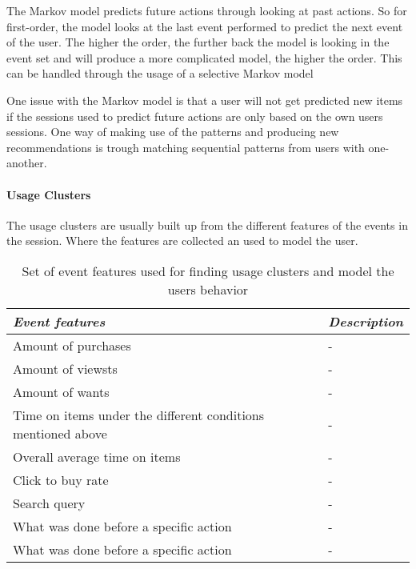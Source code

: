             The Markov model predicts future actions through looking at past actions.
            So for first-order, the model looks at the last event performed to predict the next event of the user.
            The higher the order, the further back the model is looking in the event set and will produce a more complicated model, the higher the order.
            This can be handled through the usage of a selective Markov model~\cite{Deshpande:2004:SMM:990301.990304}

            One issue with the Markov model is that a user will not get predicted new items if the sessions used to predict future actions are only based on the own users sessions.
            One way of making use of the patterns and producing new recommendations is trough matching sequential patterns from users with one-another. 


        \paragraph{Usage Clusters} %
        \label{subp:usage_clusters}
            The usage clusters are usually built up from the different features of the events in the session.
            Where the features are collected an used to model the user.

            \begin{table}[H]
                \centering
                \begin{tabular}{l|l}
                    \emph{Event features} & \emph{Description} \\ \hline
                    Amount of purchases & - \\ \hline
                    Amount of viewsts & - \\ \hline
                    Amount of wants & - \\ \hline
                    Time on items under the different conditions mentioned above & -\\ \hline
                    Overall average time on items & - \\ \hline
                    Click to buy rate & - \\ \hline
                    Search query~\cite{Zhang:2006:MSE:1135777.1136004} & - \\ \hline
                    What was done before a specific action & - \\ \hline
                    What was done before a specific action & - \\
                \end{tabular}
                \caption[Event Features]{Set of event features used for finding usage clusters and model the users behavior}
                \label{table:uasageCluster}
            \end{table}

